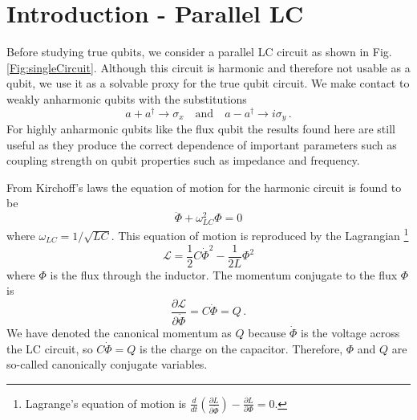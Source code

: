 \section{Introduction - Parallel LC}

Before studying true qubits, we consider a parallel LC circuit as shown in Fig.\,\ref{Fig:singleCircuit}.
Although this circuit is harmonic and therefore not usable as a qubit, we use it as a solvable proxy for the true qubit circuit.
We make contact to weakly anharmonic qubits with the substitutions
\begin{equation}
a+a^\dagger \rightarrow \sigma_x \quad \textrm{and} \quad a-a^\dagger \rightarrow i \sigma_y \, .
\end{equation}
For highly anharmonic qubits like the flux qubit the results found here are still useful as they produce the correct dependence of important parameters such as coupling strength on qubit properties such as impedance and frequency.

From Kirchoff's laws the equation of motion for the harmonic circuit is found to be \begin{equation}
\ddot{\Phi} + \omega_{LC}^2 \Phi = 0 \end{equation}
where $\omega_{LC}=1/\sqrt{LC}$. This equation of motion is reproduced by the Lagrangian \footnote{Lagrange's equation of motion is $\frac{d}{dt}\left( \frac{\partial L}{\partial \dot{\Phi}} \right) - \frac{\partial L}{\partial \Phi} = 0$.} \begin{equation}
\mathcal{L} = \frac{1}{2}C\dot{\Phi}^2 - \frac{1}{2L}\Phi^2 \end{equation}
where $\Phi$ is the flux through the inductor. The momentum conjugate to the flux $\Phi$ is
\begin{equation}
\frac{\partial \mathcal{L}}{\partial \dot{\Phi}} = C\dot{\Phi} = Q \, .
\end{equation}
We have denoted the canonical momentum as $Q$ because $\dot{\Phi}$ is the voltage across the LC circuit, so $C \dot{\Phi} = Q$ is the charge on the capacitor.
Therefore, $\Phi$ and $Q$ are so-called canonically conjugate variables.

